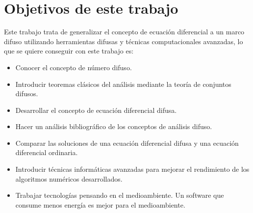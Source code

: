\section{Objetivos de este trabajo}
Este trabajo trata de generalizar el concepto de ecuación diferencial a un marco difuso utilizando herramientas difusas y técnicas computacionales avanzadas, lo que se quiere conseguir con este trabajo es:
\begin{itemize}
	\item Conocer el concepto de número difuso.
	
	\item Introducir teoremas clásicos del análisis mediante la teoría de conjuntos difusos.
	
	\item Desarrollar el concepto de ecuación diferencial difusa.
	
	\item Hacer un análisis bibliográfico de los conceptos de análisis difuso.
	
	\item Comparar las soluciones de una ecuación diferencial difusa y una ecuación diferencial ordinaria.
	
	\item Introducir técnicas informáticas avanzadas para mejorar el rendimiento de los algoritmos numéricos desarrollados.
	
	\item Trabajar tecnologías pensando en el medioambiente. Un software que consume menos energía es mejor para el medioambiente.
\end{itemize}
